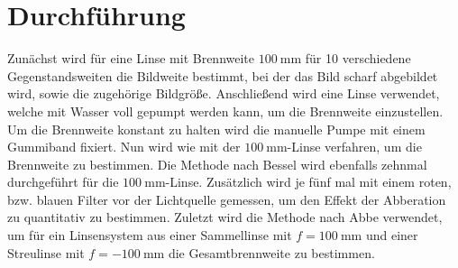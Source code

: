 \section{Durchführung}
\label{sec:Durchführung}
Zunächst wird für eine Linse mit Brennweite $\SI{100}{\milli \meter}$ für 10
verschiedene Gegenstandsweiten die Bildweite bestimmt, bei der das Bild scharf
abgebildet wird, sowie die zugehörige Bildgröße.
Anschließend wird eine Linse verwendet, welche mit Wasser voll gepumpt werden
kann, um die Brennweite einzustellen. Um die Brennweite konstant zu halten
wird die manuelle Pumpe mit einem Gummiband fixiert. Nun wird wie mit der
$\SI{100}{\milli \meter}$-Linse verfahren, um die Brennweite zu bestimmen.
Die Methode nach Bessel wird ebenfalls zehnmal durchgeführt für die
$\SI{100}{\milli \meter}$-Linse. Zusätzlich wird je fünf mal mit einem roten,
bzw. blauen Filter vor der Lichtquelle gemessen, um den Effekt der
Abberation zu quantitativ zu bestimmen.
Zuletzt wird die Methode nach Abbe verwendet, um für ein Linsensystem aus einer
Sammellinse mit $f=\SI{100}{\milli \meter}$ und einer Streulinse mit
$f=\SI{-100}{\milli \meter}$ die Gesamtbrennweite zu bestimmen.
